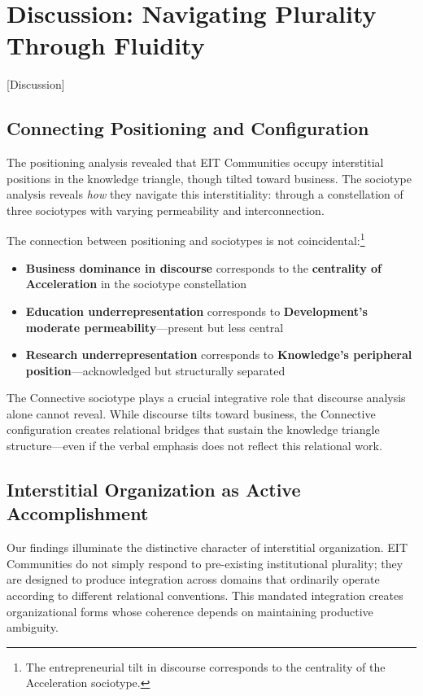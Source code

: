 \documentclass[../main.tex]{subfiles}
\begin{document}
\section{Discussion: Navigating Plurality Through Fluidity}[Discussion]

\subsection{Connecting Positioning and Configuration}

The positioning analysis revealed that EIT Communities occupy interstitial positions in the knowledge triangle, though tilted toward business. The sociotype analysis reveals \textit{how} they navigate this interstitiality: through a constellation of three sociotypes with varying permeability and interconnection.

The connection between positioning and sociotypes is not coincidental:\footnote{The entrepreneurial tilt in discourse corresponds to the centrality of the Acceleration sociotype.}

\begin{itemize}
    \item \textbf{Business dominance in discourse} corresponds to the \textbf{centrality of Acceleration} in the sociotype constellation
    \item \textbf{Education underrepresentation} corresponds to \textbf{Development's moderate permeability}---present but less central
    \item \textbf{Research underrepresentation} corresponds to \textbf{Knowledge's peripheral position}---acknowledged but structurally separated
\end{itemize}

The Connective sociotype plays a crucial integrative role that discourse analysis alone cannot reveal. While discourse tilts toward business, the Connective configuration creates relational bridges that sustain the knowledge triangle structure---even if the verbal emphasis does not reflect this relational work.

\subsection{Interstitial Organization as Active Accomplishment}

Our findings illuminate the distinctive character of interstitial organization. EIT Communities do not simply respond to pre-existing institutional plurality; they are designed to produce integration across domains that ordinarily operate according to different relational conventions. This mandated integration creates organizational forms whose coherence depends on maintaining productive ambiguity.
\end{document}
